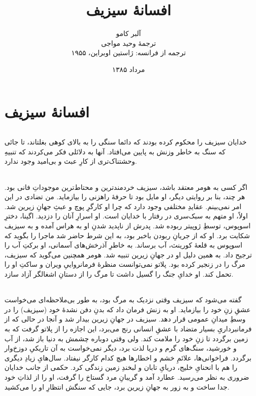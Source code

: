 \documentclass[12pt]{book}
\begin{document}
    \title{افسانهٔ سیزیف}
    \author{آلبر کامو\\
    ترجمهٔ وحید مواجی\\
    ترجمه از فرانسه: ژاستین اوبراین، ۱۹۵۵
    }
    \date{مرداد ۱۳۸۵}
    \frontmatter                            %
    \maketitle                              %
    \tableofcontents                        %
    \mainmatter


    \part{افسانهٔ سیزیف}
    \paragraph{}
    خدایان سیزیف را محکوم کرده بودند که دائما سنگی را به بالای کوهی بغلتاند، تا جائی که سنگ به خاطر وزنش به پایین می‌افتاد. آنها به دلائلی فکر می‌کردند که تنبیهِ وحشتناک‌تری از کارِ عبث و بی‌امید وجود ندارد.

    \paragraph{}
    اگر کسی به هومر معتقد باشد، سیزیف خردمندترین و محتاط‌ترین موجوداتِ فانی بود. هر چند، بنا بر روایتی دیگر، او مایل بود تا حرفهٔ راهزنی را بیازماید. من تضادی در این امر نمی‌بینم. عقایدِ مختلفی وجود دارد که چرا او کارگرِ پوچ و عبثِ جهانِ زیرین شد. اولاً، او متهم به سبک‌سری در رفتار با خدایان است. او اسرارِ آنان را دزدید. اگینا، دخترِ اسوپوس، توسطِ ژوپیتر ربوده شد. پدرش از ناپدید شدنِ او به هراس آمده و به سیزیف شکایت برد. او که از جریانِ ربودن باخبر بود، به این شرط حاضر شد ماجرا را بگوید که اسوپوس به قلعهٔ کورینث، آب برساند. به خاطرِ آذرخش‌های آسمانی، او برکتِ آب را ترجیح داد. به همین دلیل او در جهانِ زیرین تنبیه شد. هومر همچنین می‌گوید که سیزیف، مرگ را در زنجیر کرده بود. پلاتو نمی‌توانست منظرهٔ فرمانرواییِ ویران و ساکتِ او را تحمل کند. او خدایِ جنگ را گسیل داشت تا مرگ را از دستانِ اشغالگر آزاد سازد.
    
    \paragraph{}
    گفته می‌شود که سیزیف وقتی نزدیک به مرگ بود، به طور بی‌ملاحظه‌ای می‌خواست عشقِ زنِ خود را بیازماید. او به زنش فرمان داد که بدنِ دفن نشدهٔ خود (سیزیف) را در وسطِ میدانِ عمومی قرار دهد. سیزیف در جهانِ زیرین بیدار شد و آنجا در حالی که از فرمانبرداریِ بسیار متضاد با عشقِ انسانی رنج می‌برد، این اجازه را از پلاتو گرفت که به زمین برگردد تا زنِ خود را ملامت کند. ولی وقتی دوباره چشمش به دنیا باز شد، از آب و خورشید، سنگ‌های گرم و دریا لذت برد، دیگر نمی‌خواست به آن تاریکیِ دوزخ‌وار برگردد. فراخوانی‌ها، علائمِ خشم و اخطارها هیچ کدام کارگر نیفتاد. سال‌هایِ زیادِ دیگری را هم با انحنایِ خلیج، دریایِ تابان و لبخندِ زمین زندگی کرد. حکمی از جانب خدایان ضروری به نظر می‌رسید. عطارد آمد و گریبانِ مرد گستاخ را گرفت، او را از لذاتِ خود جدا ساخت و به زور به جهانِ زیرین برد، جایی که سنگش انتظارِ او را می‌کشید.
    
\end{document}
